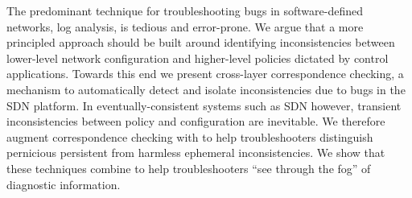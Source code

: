 The predominant technique for troubleshooting bugs in software-defined networks,
log analysis, is tedious and error-prone. We argue that a more principled
approach should be built around identifying inconsistencies between lower-level
network configuration and higher-level policies dictated by control
applications. Towards this end we present
cross-layer correspondence checking, a mechanism to automatically detect and
isolate inconsistencies due to bugs in the SDN platform. In
eventually-consistent systems such as SDN however,
transient inconsistencies between policy and configuration are inevitable.
We therefore augment correspondence checking with \simulator to help troubleshooters
distinguish pernicious persistent from harmless ephemeral inconsistencies. We
show that these techniques combine to help troubleshooters ``see through the fog'' of
diagnostic information.
